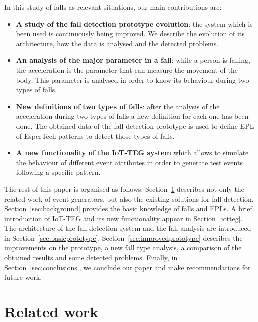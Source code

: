 \documentclass[journal]{IEEEtran}
\begin{document}
In this study of falls as relevant situations, our main contributions are:

\begin{itemize}
\item \textbf{A study of the fall detection prototype evolution}: the system which is been used is
 continuously being improved. We describe the evolution of its architecture, how the data is analysed and 
 the detected problems.
 \item \textbf{An analysis of the major parameter in a fall}: while a person is falling, the acceleration 
 is the parameter that can measure the movement of the body. This parameter is analysed in order to know 
 its behaviour during two types of falls.
 \item \textbf{New definitions of two types of falls}: after the analysis of the acceleration during two 
 types of falls a new definition for each one has been done. The obtained data of the fall-detection 
 prototype is used to define EPL of EsperTech patterns to detect those types of falls. 
 \item \textbf{A new functionality of the IoT-TEG system} which allows to simulate the behaviour of 
 different event attributes in order to generate test events following a specific pattern. 
\end{itemize}

The rest of this paper is organised as follows. Section~\ref{sec:relatedwork}
describes not only the related work of event generators, but also the existing
solutions for fall-detection. Section~\ref{sec:background} provides the basic
knowledge of falls and EPLs. A brief introduction of IoT-TEG and its new functionality
appear in Section~\ref{iotteg}. The architecture of the fall detection system and the 
fall analysis are introduced in Section~\ref{sec:basicprototype}. Section~\ref{sec:improvedprototype}
describes the improvements on the prototype, a new fall type analysis,
a comparison of the obtained results and some detected problems. Finally, in Section~\ref{sec:conclusions}, 
we conclude our paper and make recommendations for future work.

\section{Related work}
\label{sec:relatedwork}
\end{document}
